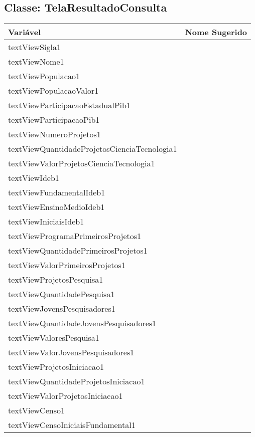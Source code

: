 \documentclass[12pt]{article}
\begin{document}
	\subsection{Classe: TelaResultadoConsulta}
		\begin{table}[H]
			\begin{center}
				\begin{tabular}{l | l}
					\toprule
						Variável & Nome Sugerido\\
					\midrule
						textViewSigla1 & \\
						textViewNome1 & \\
						textViewPopulacao1 & \\
						textViewPopulacaoValor1 & \\
						textViewParticipacaoEstadualPib1 & \\
						textViewParticipacaoPib1 & \\
						textViewNumeroProjetos1 & \\
						textViewQuantidadeProjetosCienciaTecnologia1 & \\
						textViewValorProjetosCienciaTecnologia1 & \\
						textViewIdeb1 & \\
						textViewFundamentalIdeb1 & \\
						textViewEnsinoMedioIdeb1 & \\
						textViewIniciaisIdeb1 & \\
						textViewProgramaPrimeirosProjetos1 & \\
						textViewQuantidadePrimeirosProjetos1 & \\
						textViewValorPrimeirosProjetos1 & \\
						textViewProjetosPesquisa1 & \\
						textViewQuantidadePesquisa1 & \\
						textViewJovensPesquisadores1 & \\
						textViewQuantidadeJovensPesquisadores1 & \\
						textViewValoresPesquisa1 & \\
						textViewValorJovensPesquisadores1 & \\
						textViewProjetosIniciacao1 & \\
						textViewQuantidadeProjetosIniciacao1 & \\
						textViewValorProjetosIniciacao1 & \\
						textViewCenso1 & \\
						textViewCensoIniciaisFundamental1 & \\

\end{tabular}
\end{center}
\end{table}
\end{document}
